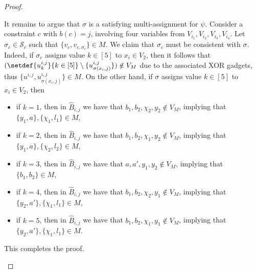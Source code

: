 \begin{proof}
\begin{nestedproof}
            It remains to argue that $\sigma$ is a satisfying multi-assignment for $\psi$.
            Consider a constraint $c$ with $b(c)=j$,
            involving four variables from $V_{i_1}, V_{i_2}, V_{i_3}, V_{i_4}$.
            Let $\sigma_c \in \mathcal{S}_c$ such that $\{v_c, v_{c,\sigma_c}\} \in M$.
            We claim that $\sigma_c$ must be consistent with $\sigma$.
            Indeed, if $\sigma_c$ assigns value $k \in [5]$ to $x_i \in V_2$,
            then it follows that $(\setdef{u^{i,j}_k}{k \in [5]} \setminus \{u^{i,j}_{\sigma(x_i, j)}\}) \notin V_M$
            due to the associated XOR gadgets, thus $\{u^{i,j}, u^{i,j}_{\sigma(x_i, j)}\} \in M$.
            On the other hand, if $\sigma$ assigns value $k \in [5]$ to $x_i \in V_2$,
            then
            \begin{itemize}
                \item if $k=1$, then in $\hat{B}_{i,j}$ we have that $b_1,b_2,\chi_2,y_2 \notin V_M$, implying that $\{y_1,a\}, \{\chi_1,l_1\} \in M$,
                \item if $k=2$, then in $\hat{B}_{i,j}$ we have that $b_1,b_2,\chi_1,y_2 \notin V_M$, implying that $\{y_1,a\}, \{\chi_2,l_2\} \in M$,
                \item if $k=3$, then in $\hat{B}_{i,j}$ we have that $a,a',y_1,y_2 \notin V_M$, implying that $\{b_1,b_2\} \in M$,
                \item if $k=4$, then in $\hat{B}_{i,j}$ we have that $b_1,b_2,\chi_2,y_1 \notin V_M$, implying that $\{y_2,a'\}, \{\chi_1,l_1\} \in M$,
                \item if $k=5$, then in $\hat{B}_{i,j}$ we have that $b_1,b_2,\chi_1,y_1 \notin V_M$, implying that $\{y_2,a'\}, \{\chi_1,l_1\} \in M$.
            \end{itemize}
            This completes the proof.
        \end{nestedproof}


\end{proof}

